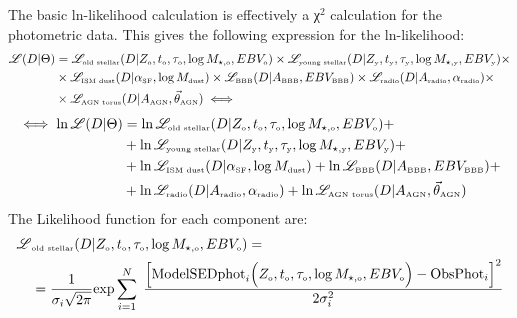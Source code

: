 The basic ln-likelihood calculation is effectively a χ$^2$ calculation for the photometric data. This gives the following expression for the ln-likelihood:
\begin{equation*} 
\begin{aligned}
\mathscr{L}(D|\Theta)  & = \mathscr{L}_{\mbox{\tiny{old stellar}}}(D| Z_{\mbox{\tiny{o}}}, t_{\mbox{\tiny{o}}}, \tau_{\mbox{\tiny{o}}}, \log M_{\star, \mbox{\tiny{o}}}, EBV_{\mbox{\tiny{o}}})  \times  \mathscr{L}_{\mbox{\tiny{young stellar}}}(D| Z_{\mbox{\tiny{y}}}, t_{\mbox{\tiny{y}}}, \tau_{\mbox{\tiny{y}}}, \log M_{\star, \mbox{\tiny{y}}}, EBV_{\mbox{\tiny{y}}}) \times \\  
& \times \mathscr{L}_{\mbox{\tiny{ISM dust}}}(D|\alpha_{\mbox{\tiny{SF}}}, \log M_{\mbox{\tiny{dust}}})  \times  \mathscr{L}_{\mbox{\tiny{BBB}}}(D|A_{\mbox{\tiny{BBB}}}, EBV_{\mbox{\tiny{BBB}}}) \times  \mathscr{L}_{\mbox{\tiny{radio}}}(D|A_{\mbox{\tiny{radio}}}, \alpha_{\mbox{\tiny{radio}}}) \times   \\ 
& \times\mathscr{L}_{\mbox{\tiny{AGN torus}}}(D|A_{\mbox{\tiny{AGN}}}, \vec{\theta}_{\mbox{\tiny{AGN}}})   \iff 
\end{aligned} 
\end{equation*}
\begin{equation} 
\begin{aligned}
\iff \ln \mathscr{L}(D|\Theta)  & =\ln \mathscr{L}_{\mbox{\tiny{old stellar}}}(D| Z_{\mbox{\tiny{o}}}, t_{\mbox{\tiny{o}}}, \tau_{\mbox{\tiny{o}}}, \log M_{\star, \mbox{\tiny{o}}}, EBV_{\mbox{\tiny{o}}})  + \\
&+\ln \mathscr{L}_{\mbox{\tiny{young stellar}}}(D| Z_{\mbox{\tiny{y}}}, t_{\mbox{\tiny{y}}}, \tau_{\mbox{\tiny{y}}}, \log M_{\star, \mbox{\tiny{y}}}, EBV_{\mbox{\tiny{y}}}) + \\  
& +\ln \mathscr{L}_{\mbox{\tiny{ISM dust}}}(D|\alpha_{\mbox{\tiny{SF}}}, \log M_{\mbox{\tiny{dust}}})  +  \ln \mathscr{L}_{\mbox{\tiny{BBB}}}(D|A_{\mbox{\tiny{BBB}}}, EBV_{\mbox{\tiny{BBB}}}) + \\
& +\ln \mathscr{L}_{\mbox{\tiny{radio}}}(D|A_{\mbox{\tiny{radio}}}, \alpha_{\mbox{\tiny{radio}}}) +   \ln \mathscr{L}_{\mbox{\tiny{AGN torus}}}(D|A_{\mbox{\tiny{AGN}}}, \vec{\theta}_{\mbox{\tiny{AGN}}})  
\end{aligned} \label{eq:LikeliTot}
\end{equation}
The Likelihood function for each component are:
\begin{equation} \begin{split}
    \mathscr{L}&_{\mbox{\tiny{old stellar}}}(D| Z_{\mbox{\tiny{o}}}, t_{\mbox{\tiny{o}}}, \tau_{\mbox{\tiny{o}}}, \log M_{\star, \mbox{\tiny{o}}}, EBV_{\mbox{\tiny{o}}}) = \\ & =  \dfrac{1}{\sigma_i\sqrt{2\pi} }  \mbox{exp} \sum_{i=1}^{N}\; \dfrac{ \Big[ \mbox{ModelSEDphot}_i\Big( Z_{\mbox{\tiny{o}}}, t_{\mbox{\tiny{o}}}, \tau_{\mbox{\tiny{o}}}, \log M_{\star, \mbox{\tiny{o}}}, EBV_{\mbox{\tiny{o}}}\Big)- \mbox{ObsPhot}_i   \Big]^2}{ 2 \sigma_i^2   }
  \end{split} \label{eq:LikeliOS}
\end{equation} 

